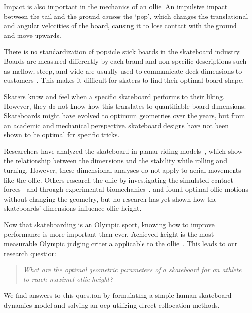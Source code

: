 \documentclass[default,iicol,pdflatex]{sn-jnl}
\begin{document}
Impact is also important in the mechanics of an ollie.
An impulsive impact between the tail and the ground causes the `pop', which changes the translational and angular velocities of the board, causing it to lose contact with the ground and move upwards.

There is no standardization of popsicle stick boards in the skateboard industry.
Boards are measured differently by each brand and non-specific descriptions such as mellow, steep, and wide are usually used to communicate deck dimensions to customers~\cite{berger_handmade_2021}.
This makes it difficult for skaters to find their optimal board shape.

Skaters know and feel when a specific skateboard performs to their liking.
However, they do not know how this translates to quantifiable board dimensions.
Skateboards might have evolved to optimum geometries over the years, but from an academic and mechanical perspective, skateboard designs have not been shown to be optimal for specific tricks.

Researchers have analyzed the skateboard in planar riding models~\cite{hubbard_lateral_1979,kremnev_nonlinear_2010,varszegi_stability_2017}, which show the relationship between the dimensions and the stability while rolling and turning. 
However, these dimensional analyses do not apply to aerial movements like the ollie.
Others research the ollie by investigating the simulated contact forces~\cite{anderson_ollie_2020,shield_contact-implicit_2022} and through experimental biomechanics~\cite{frederick_biomechanics_2006,vorlicek_analysis_2015,wood_3d_2020,candotti_lower_2012,dias_using_2016}.
\citet{shield_contact-implicit_2022} and \citet{anderson_ollie_2020} found optimal ollie motions without changing the geometry, but no research has yet shown how the skateboards' dimensions influence ollie height.

Now that skateboarding is an Olympic sport, knowing how to improve performance is more important than ever.
Achieved height is the most measurable Olympic judging criteria applicable to the ollie~\cite{world_skate_skateboarding_2021}.
This leads to our research question:
\begin{quote}
\textit{What are the optimal geometric parameters of a skateboard for an athlete to reach maximal ollie height?}
\end{quote}
We find answers to this question by formulating a simple human-skateboard dynamics model and solving an \gls{ocp} utilizing direct collocation methods.
\end{document}
